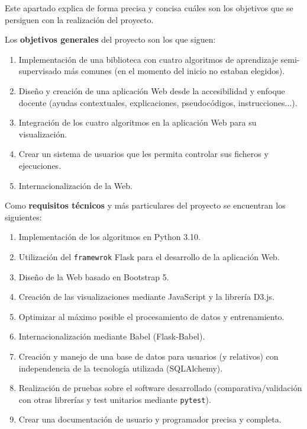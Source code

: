
Este apartado explica de forma precisa y concisa cuáles son los objetivos que se
persiguen con la realización del proyecto.


Los \textbf{objetivos generales} del proyecto son los que siguen:
\begin{enumerate}
    \item Implementación de una biblioteca con cuatro algoritmos de aprendizaje
    semi-supervisado más comunes (en el momento del inicio no estaban elegidos).
    \item Diseño y creación de una aplicación Web desde la accesibilidad y
    enfoque docente (ayudas contextuales, explicaciones, pseudocódigos,
    instrucciones...).
    \item Integración de los cuatro algoritmos en la aplicación Web para su
    visualización.
    \item Crear un sistema de usuarios que les permita controlar sus ficheros y ejecuciones.
    \item Internacionalización de la Web.
\end{enumerate}

Como \textbf{requisitos técnicos} y más particulares del proyecto se encuentran
los siguientes:

\begin{enumerate}
    \item Implementación de los algoritmos en Python 3.10.
    \item Utilización del \texttt{framewrok} Flask para el desarrollo de la
    aplicación Web.
    \item Diseño de la Web basado en Bootstrap 5.
    \item Creación de las visualizaciones mediante JavaScript y la librería
    D3.js.
    \item Optimizar al máximo posible el procesamiento de datos y entrenamiento.
    \item Internacionalización mediante Babel (Flask-Babel).
    \item Creación y manejo de una base de datos para usuarios (y relativos) con
    independencia de la tecnología utilizada (SQLAlchemy).
    \item Realización de pruebas sobre el software desarrollado
    (comparativa/validación con otras librerías y test unitarios mediante
    \texttt{pytest}).
    \item Crear una documentación de usuario y programador precisa y completa.
\end{enumerate}